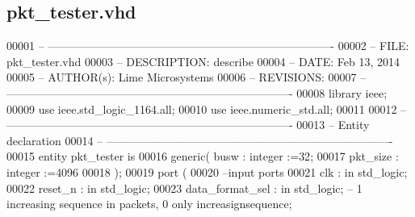 \subsection{pkt\+\_\+tester.\+vhd}
\label{pkt__tester_8vhd_source}

\begin{DoxyCode}
00001 \textcolor{keyword}{-- ---------------------------------------------------------------------------- }
00002 \textcolor{keyword}{-- FILE:    pkt\_tester.vhd}
00003 \textcolor{keyword}{-- DESCRIPTION: describe}
00004 \textcolor{keyword}{-- DATE:    Feb 13, 2014}
00005 \textcolor{keyword}{-- AUTHOR(s):   Lime Microsystems}
00006 \textcolor{keyword}{-- REVISIONS:}
00007 \textcolor{keyword}{-- ---------------------------------------------------------------------------- }
00008 \textcolor{vhdlkeyword}{library }\textcolor{keywordflow}{ieee};
00009 \textcolor{vhdlkeyword}{use }ieee.std\_logic\_1164.\textcolor{keywordflow}{all};
00010 \textcolor{vhdlkeyword}{use }ieee.numeric\_std.\textcolor{keywordflow}{all};
00011 
00012 \textcolor{keyword}{-- ----------------------------------------------------------------------------}
00013 \textcolor{keyword}{-- Entity declaration}
00014 \textcolor{keyword}{-- ----------------------------------------------------------------------------}
00015 \textcolor{keywordflow}{entity }pkt_tester \textcolor{keywordflow}{is}
00016     \textcolor{keywordflow}{generic}\textcolor{vhdlchar}{(} \textcolor{vhdlchar}{busw}       \textcolor{vhdlchar}{:} \textcolor{comment}{integer} \textcolor{vhdlchar}{:=}\textcolor{vhdllogic}{}\textcolor{vhdllogic}{32};
00017                 \textcolor{vhdlchar}{pkt_size}    \textcolor{vhdlchar}{:} \textcolor{comment}{integer} \textcolor{vhdlchar}{:=}\textcolor{vhdllogic}{}\textcolor{vhdllogic}{4096}
00018     \textcolor{vhdlchar}{)};
00019   \textcolor{keywordflow}{port} \textcolor{vhdlchar}{(}
00020 \textcolor{keyword}{        --input ports }
00021           \textcolor{vhdlchar}{clk}               \textcolor{vhdlchar}{:} \textcolor{keywordflow}{in} \textcolor{comment}{std\_logic};
00022         \textcolor{vhdlchar}{reset_n}         \textcolor{vhdlchar}{:} \textcolor{keywordflow}{in} \textcolor{comment}{std\_logic};
00023           \textcolor{vhdlchar}{data_format_sel}   \textcolor{vhdlchar}{:} \textcolor{keywordflow}{in} \textcolor{comment}{std\_logic};\textcolor{keyword}{ -- 1 increasing sequence in packets, 0 only increasignsequence;}

\end{DoxyCode}
